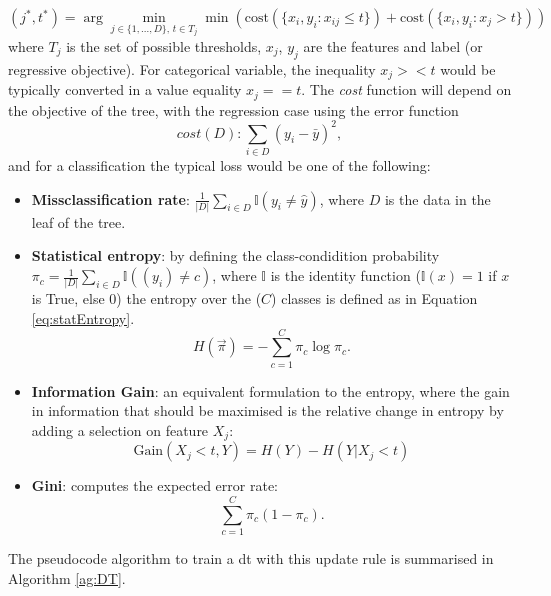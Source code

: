 \begin{equation}\label{eq:DTcost}
    (j^*, t^*) = \arg\min_{j\in \{1, ..., D\},\, t \in T_j} \min \left(\text{cost} (\{x_i, y_i : x_{ij} \leq t\}) + \text{cost}(\{x_i, y_i : x_j > t\}) \right)
\end{equation}
where $T_j$ is the set of possible thresholds, $x_j$, $y_j$ are the features and label (or regressive objective). For categorical variable, the inequality $x_j >< t$ would be typically converted in a value equality $x_j == t$. The \textit{cost} function will depend on the objective of the tree, with the regression case using the error function \[cost(D) : \sum_{i\in D}(y_i - \bar{y})^2,\] and for a classification the typical loss would be one of the following:
\begin{itemize}
    \item \textbf{Missclassification rate}: $\frac{1}{|D|} \sum_{i \in D} \mathbb{I}(y_i \neq \hat{y})$, where $D$ is the data in the leaf of the tree. 
    \item \textbf{Statistical entropy}: by defining the class-condidition probability $\pi_c = \frac{1}{|D|} \sum_{i \in D} \mathbb{I}((y_i) \neq c)$, where $\mathbb{I}$ is the identity function ($\mathbb{I}(x) = 1$ if $x$ is True, else $0$) the entropy over the ($C$) classes is defined as in Equation \ref{eq:statEntropy}. 
    \begin{equation}\label{eq:statEntropy}
        H(\vec{\pi}) = - \sum_{c=1}^C \pi_c \log \pi_c.
    \end{equation}
    \item \textbf{Information Gain}: an equivalent formulation to the entropy, where the gain in information that should be maximised is the relative change in entropy by adding a selection on feature $X_j$: 
    \[ \text{Gain}(X_j < t, Y) = H(Y) - H(Y | X_j < t) \]
    \item \textbf{Gini}: computes the expected error rate: \[\sum_{c=1}^C \pi_c (1 - \pi_c).\]
\end{itemize}


The pseudocode algorithm to train a \gls{dt} with this update rule is summarised in Algorithm \ref{ag:DT}. 

